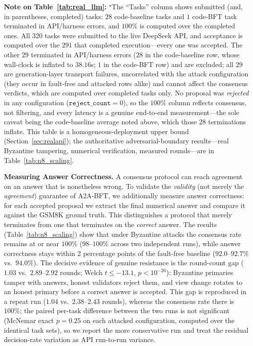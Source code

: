 \documentclass{article}
\begin{document}
\textbf{Note on Table~\ref{tab:real_llm}:} $^\star$The ``Tasks'' column shows submitted (and, in parentheses, completed) tasks: $28$ code-baseline tasks and $1$ code-BFT task terminated in API/harness errors, and $100\%$ is computed over the completed ones. All 320 tasks were submitted to the live DeepSeek API, and acceptance is computed over the $291$ that completed execution---every one was accepted. The other $29$ terminated in API/harness errors ($28$ in the code-baseline row, whose wall-clock is inflated to $38.16$s; $1$ in the code-BFT row) and are excluded; all $29$ are generation-layer transport failures, uncorrelated with the attack configuration (they occur in fault-free and attacked rows alike) and cannot affect the consensus verdicts, which are computed over completed tasks only. No proposal was \emph{rejected} in any configuration ($\texttt{reject\_count}=0$), so the $100\%$ column reflects consensus, not filtering, and every latency is a genuine end-to-end measurement---the sole caveat being the code-baseline average noted above, which those $28$ terminations inflate. This table is a homogeneous-deployment upper bound (Section~\ref{sec:realapi}); the authoritative adversarial-boundary results---real Byzantine tampering, numerical verification, measured rounds---are in Table~\ref{tab:n8_scaling}.

\textbf{Measuring Answer Correctness.} A consensus protocol can reach agreement on an answer that is nonetheless wrong. To validate the \emph{validity} (not merely the \emph{agreement}) guarantee of A2A-BFT, we additionally measure answer correctness: for each accepted proposal we extract the final numerical answer and compare it against the GSM8K ground truth. This distinguishes a protocol that merely terminates from one that terminates on the \emph{correct} answer. The results (Table~\ref{tab:n8_scaling}) show that under Byzantine attacks the consensus rate remains at or near $100\%$ ($98$--$100\%$ across two independent runs), while answer correctness stays within 2 percentage points of the fault-free baseline ($92.0$--$92.7\%$ vs.\ $94.0\%$). The decisive evidence of genuine resistance is the round-count gap ($1.03$ vs.\ $2.89$--$2.92$ rounds; Welch $t \leq -13.1$, $p < 10^{-26}$): Byzantine primaries tamper with answers, honest validators reject them, and view change rotates to an honest primary before a correct answer is accepted. This gap is reproduced in a repeat run ($1.04$ vs.\ $2.38$--$2.43$ rounds), whereas the consensus rate there is $100\%$; the paired per-task difference between the two runs is not significant (McNemar exact $p = 0.25$ on each attacked configuration, computed over the identical task sets), so we report the more conservative run and treat the residual decision-rate variation as API run-to-run variance.
\end{document}
